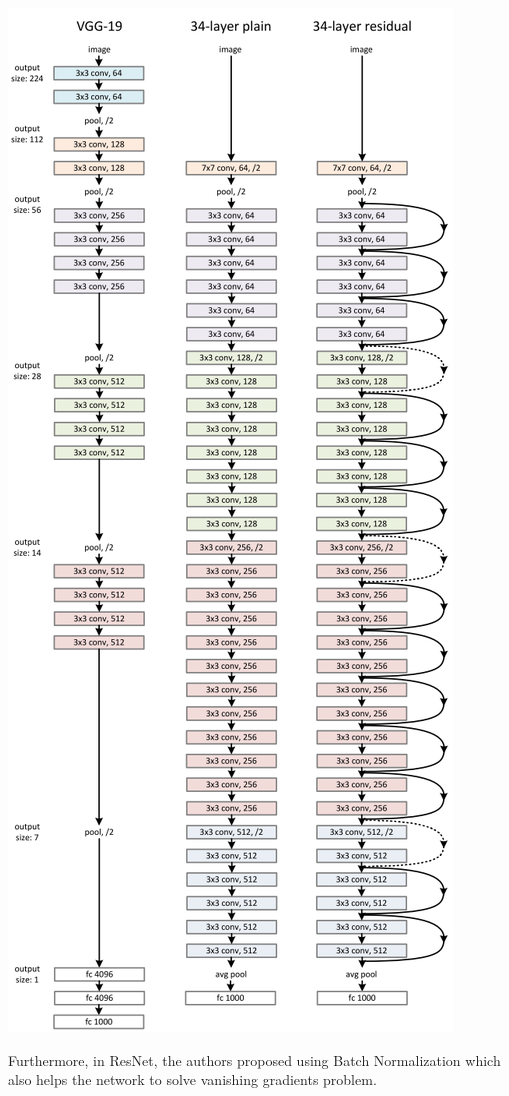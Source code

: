 \begin{center}
\includegraphics[scale=0.3]{compare_resnet.png}
\end{center}
\pagebreak
\par Furthermore, in ResNet, the authors proposed using Batch Normalization which also helps the network to solve vanishing gradients problem.
